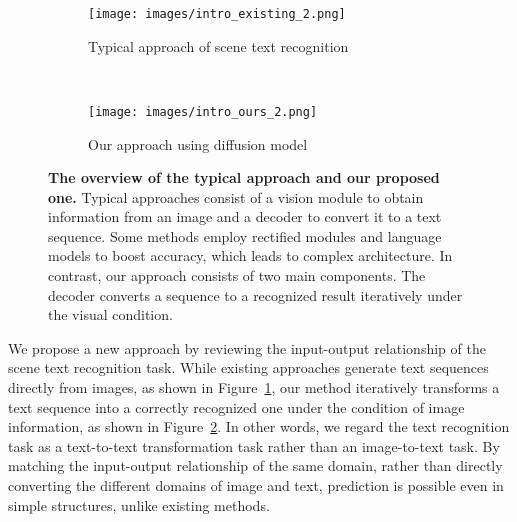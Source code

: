 \documentclass{article}
\begin{document}
\begin{figure}[t]
    \centering
    \begin{subfigure}{.45\textwidth}
        \texttt{[image: images/intro\_existing\_2.png]}
        \caption{Typical approach of scene text recognition
        }
        \label{fig:recent_approach}
    \end{subfigure}\hfill \\
    \vspace*{1.00\baselineskip}
    \begin{subfigure}{.45\textwidth}
        \texttt{[image: images/intro\_ours\_2.png]}
        \caption{Our approach using diffusion model
        }
        \label{fig:our_approach}
    \end{subfigure}\hfill
    \caption{
    \textbf{The overview of the typical approach and our proposed one.}
Typical approaches consist of a vision module to obtain information from an image and a decoder to convert it to a text sequence.
Some methods employ rectified modules and language models to boost accuracy, which leads to complex architecture.
In contrast, our approach consists of two main components.
The decoder converts a sequence to a recognized result iteratively under the visual condition.
    }
    \label{fig:abstract_approach}
    \vspace*{-1.00\baselineskip}
\end{figure}


We propose a new approach by reviewing the input-output relationship of the scene text recognition task.
While existing approaches generate text sequences directly from images, as shown in Figure~\ref{fig:recent_approach}, our method iteratively transforms a text sequence into a correctly recognized one under the condition of image information, as shown in Figure~\ref{fig:our_approach}.
In other words, we regard the text recognition task as a text-to-text transformation task rather than an image-to-text task.
By matching the input-output relationship of the same domain, rather than directly converting the different domains of image and text, prediction is possible even in simple structures, unlike existing methods.
\end{document}
